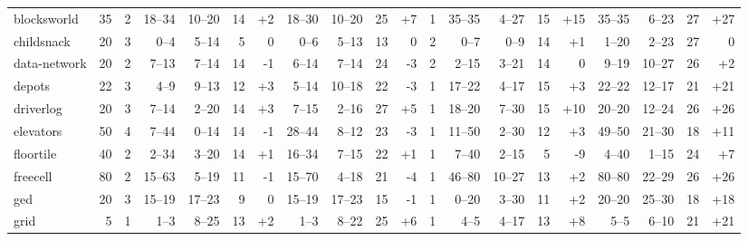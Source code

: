\documentclass{article}
\begin{document}
\begin{table}[h]
\begin{tabular}{l@{}rr|rrrr|rrrr|r|rrrr|rrrr}
   blocksworld &     35 &   2 &   18--34 &  10--20 &  14 &  {\color{blue}+2} &   18--30 &  10--20 &  25 &   {\color{blue}+7} &   1 &    35--35 &   4--27 &  15 &  {\color{blue}+15} &    35--35 &   6--23 &  27 &  {\color{blue}+27} \\
    childsnack &     20 &   3 &     0--4 &   5--14 &   5 &                 0 &     0--6 &   5--13 &  13 &                  0 &   2 &      0--7 &    0--9 &  14 &   {\color{blue}+1} &     1--20 &   2--23 &  27 &                  0 \\
  data-network &     20 &   2 &    7--13 &   7--14 &  14 &   {\color{red}-1} &    6--14 &   7--14 &  24 &    {\color{red}-3} &   2 &     2--15 &   3--21 &  14 &                  0 &     9--19 &  10--27 &  26 &   {\color{blue}+2} \\
        depots &     22 &   3 &     4--9 &   9--13 &  12 &  {\color{blue}+3} &    5--14 &  10--18 &  22 &    {\color{red}-3} &   1 &    17--22 &   4--17 &  15 &   {\color{blue}+3} &    22--22 &  12--17 &  21 &  {\color{blue}+21} \\
     driverlog &     20 &   3 &    7--14 &   2--20 &  14 &  {\color{blue}+3} &    7--15 &   2--16 &  27 &   {\color{blue}+5} &   1 &    18--20 &   7--30 &  15 &  {\color{blue}+10} &    20--20 &  12--24 &  26 &  {\color{blue}+26} \\
     elevators &     50 &   4 &    7--44 &   0--14 &  14 &   {\color{red}-1} &   28--44 &   8--12 &  23 &    {\color{red}-3} &   1 &    11--50 &   2--30 &  12 &   {\color{blue}+3} &    49--50 &  21--30 &  18 &  {\color{blue}+11} \\
     floortile &     40 &   2 &    2--34 &   3--20 &  14 &  {\color{blue}+1} &   16--34 &   7--15 &  22 &   {\color{blue}+1} &   1 &     7--40 &   2--15 &   5 &    {\color{red}-9} &     4--40 &   1--15 &  24 &   {\color{blue}+7} \\
      freecell &     80 &   2 &   15--63 &   5--19 &  11 &   {\color{red}-1} &   15--70 &   4--18 &  21 &    {\color{red}-4} &   1 &    46--80 &  10--27 &  13 &   {\color{blue}+2} &    80--80 &  22--29 &  26 &  {\color{blue}+26} \\
           ged &     20 &   3 &   15--19 &  17--23 &   9 &                 0 &   15--19 &  17--23 &  15 &    {\color{red}-1} &   1 &     0--20 &   3--30 &  11 &   {\color{blue}+2} &    20--20 &  25--30 &  18 &  {\color{blue}+18} \\
          grid &      5 &   1 &     1--3 &   8--25 &  13 &  {\color{blue}+2} &     1--3 &   8--22 &  25 &   {\color{blue}+6} &   1 &      4--5 &   4--17 &  13 &   {\color{blue}+8} &      5--5 &   6--10 &  21 &  {\color{blue}+21} \\

\end{tabular}
\end{table}
\end{document}

